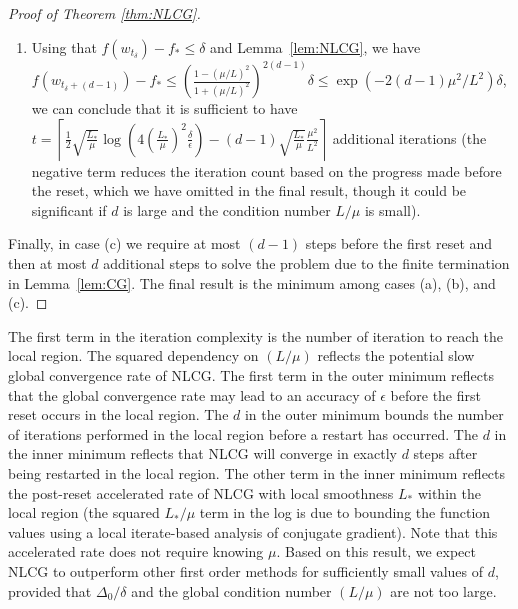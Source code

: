 \documentclass[10pt]{article} %
\begin{document}
\begin{proof}[Proof of Theorem \ref{thm:NLCG}]
\begin{enumerate}
\item Using that $f(w_{t_\delta}) - f_* \leq \delta$ and Lemma~\ref{lem:NLCG}, we have $f(w_{t_\delta + (d-1)}) - f_* \leq \left(\frac{1-(\mu/L)^2}{1+(\mu/L)^2}\right)^{2(d-1)}\delta \leq \exp(-2(d-1)\mu^2/L^2)\delta$, we can conclude that it is sufficient to have $t = \left\lceil \frac 1 2\sqrt{\frac{L_{*}}{\mu}}\log\left(4\left(\frac{L_*}{\mu}\right)^2\frac{\delta}{\epsilon}\right) - (d-1)\sqrt{\frac{L_*}{\mu}}\frac{\mu^2}{L^2} \right\rceil$ additional iterations (the negative term reduces the iteration count based on the progress made before the reset, which we have omitted in the final result, though it could be significant if $d$ is large and the condition number $L/\mu$ is small). 
\end{enumerate}
Finally, in case (c) we require at most $(d-1)$ steps before the first reset and then at most $d$ additional steps to solve the problem due to the finite termination in Lemma~\ref{lem:CG}. The final result is the minimum among cases (a), (b), and (c).
\end{proof}

The first term in the iteration complexity is the number of iteration to reach the local region. The squared dependency on $(L/\mu)$ reflects the potential slow global convergence rate of NLCG. The first term in the outer minimum reflects that the global convergence rate may lead to an accuracy of $\epsilon$ before the first reset occurs in the local region. The $d$ in the outer minimum bounds the number of iterations performed in the local region before a restart has occurred. The $d$ in the inner minimum reflects that NLCG will converge in exactly $d$ steps after being restarted in the local region. 
The other term in the inner minimum reflects the post-reset accelerated rate of NLCG with local smoothness $L_*$ within the local region (the squared $L_*/\mu$ term in the log is due to bounding the function values using a local iterate-based analysis of conjugate gradient). Note that this accelerated rate does not require knowing $\mu$.
Based on this result, we expect NLCG to outperform other first order methods for sufficiently small values of $d$, provided that $\Delta_0/\delta$ and the global condition number $(L/\mu)$ are not too large.
\end{document}
